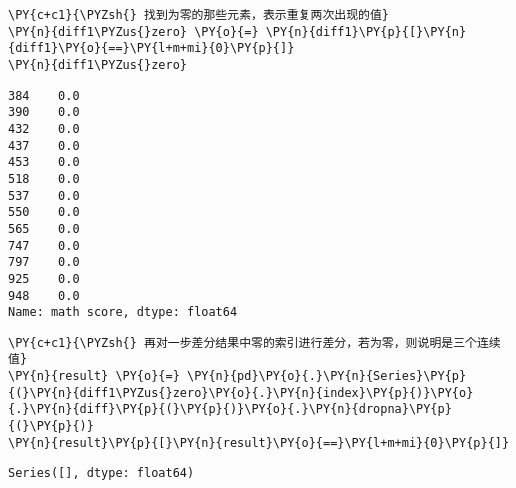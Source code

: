     \begin{tcolorbox}[breakable, size=fbox, boxrule=1pt, pad at break*=1mm,colback=cellbackground, colframe=cellborder]
\begin{Verbatim}[commandchars=\\\{\}]
\PY{c+c1}{\PYZsh{} 找到为零的那些元素，表示重复两次出现的值}
\PY{n}{diff1\PYZus{}zero} \PY{o}{=} \PY{n}{diff1}\PY{p}{[}\PY{n}{diff1}\PY{o}{==}\PY{l+m+mi}{0}\PY{p}{]}
\PY{n}{diff1\PYZus{}zero}
\end{Verbatim}
\end{tcolorbox}

            \begin{tcolorbox}[breakable, size=fbox, boxrule=.5pt, pad at break*=1mm, opacityfill=0]
\begin{Verbatim}[commandchars=\\\{\}]
384    0.0
390    0.0
432    0.0
437    0.0
453    0.0
518    0.0
537    0.0
550    0.0
565    0.0
747    0.0
797    0.0
925    0.0
948    0.0
Name: math score, dtype: float64
\end{Verbatim}
\end{tcolorbox}
        
    \begin{tcolorbox}[breakable, size=fbox, boxrule=1pt, pad at break*=1mm,colback=cellbackground, colframe=cellborder]
\begin{Verbatim}[commandchars=\\\{\}]
\PY{c+c1}{\PYZsh{} 再对一步差分结果中零的索引进行差分，若为零，则说明是三个连续值}
\PY{n}{result} \PY{o}{=} \PY{n}{pd}\PY{o}{.}\PY{n}{Series}\PY{p}{(}\PY{n}{diff1\PYZus{}zero}\PY{o}{.}\PY{n}{index}\PY{p}{)}\PY{o}{.}\PY{n}{diff}\PY{p}{(}\PY{p}{)}\PY{o}{.}\PY{n}{dropna}\PY{p}{(}\PY{p}{)}
\PY{n}{result}\PY{p}{[}\PY{n}{result}\PY{o}{==}\PY{l+m+mi}{0}\PY{p}{]}
\end{Verbatim}
\end{tcolorbox}

            \begin{tcolorbox}[breakable, size=fbox, boxrule=.5pt, pad at break*=1mm, opacityfill=0]
\begin{Verbatim}[commandchars=\\\{\}]
Series([], dtype: float64)
\end{Verbatim}
\end{tcolorbox}
